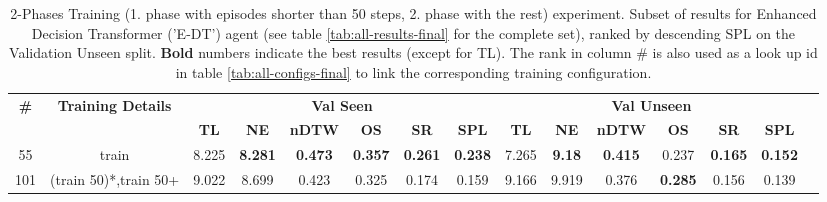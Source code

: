 \begin{table}
\centering
\caption{\label{tab:e_dt_split_training_50}2-Phases Training (1. phase with episodes shorter than 50 steps, 2. phase with the rest) experiment. Subset of results for Enhanced Decision Transformer ('E-DT') agent (see table \ref{tab:all-results-final} for the complete set), ranked by descending SPL on the Validation Unseen split. \textbf{Bold} numbers indicate the best results (except for TL). The rank in column \# is also used as a look up id in table \ref{tab:all-configs-final} to link the corresponding training configuration.}
\begin{tabular}{@{\hskip3pt}c@{\hskip3pt}c@{\hskip3pt}c@{\hskip3pt}c@{\hskip3pt}c@{\hskip3pt}c@{\hskip3pt}c@{\hskip3pt}c@{\hskip3pt}c@{\hskip3pt}c@{\hskip3pt}c@{\hskip3pt}c@{\hskip3pt}c@{\hskip3pt}c@{\hskip3pt}c}
\toprule
                                  \textbf{\#} & \textbf{Training Details} & \multicolumn{6}{c}{\textbf{Val Seen}} & \multicolumn{6}{c}{\textbf{Val Unseen}} \\
\cmidrule(l){3-8}\cmidrule(l){9-14}\textbf{~} &                \textbf{~} &       \textbf{TL} &     \textbf{NE} &   \textbf{nDTW} &     \textbf{OS} &     \textbf{SR} &    \textbf{SPL} &         \textbf{TL} &    \textbf{NE} &   \textbf{nDTW} &     \textbf{OS} &     \textbf{SR} &    \textbf{SPL} \\
\midrule
                                           55 &                     train &             8.225 &  \textbf{8.281} &  \textbf{0.473} &  \textbf{0.357} &  \textbf{0.261} &  \textbf{0.238} &               7.265 &  \textbf{9.18} &  \textbf{0.415} &           0.237 &  \textbf{0.165} &  \textbf{0.152} \\
                                          101 &     (train 50)*,train 50+ &             9.022 &           8.699 &           0.423 &           0.325 &           0.174 &           0.159 &               9.166 &          9.919 &           0.376 &  \textbf{0.285} &           0.156 &           0.139 \\
\bottomrule
\end{tabular}
\end{table}
